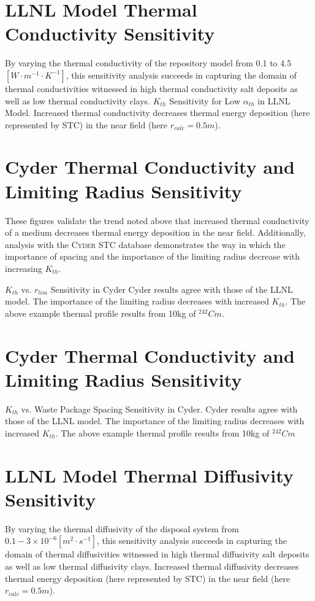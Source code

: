 \documentclass[letterpaper]{article}
\newcommand{\Cyder}{\textsc{Cyder}\xspace}
\begin{document}
\section*{LLNL Model Thermal Conductivity Sensitivity}
By varying the thermal conductivity of the repository model from 0.1 to 4.5 
$[W\cdot m^{-1} \cdot K^{-1}]$, this sensitivity analysis succeeds in capturing 
the domain of thermal conductivities witnessed in high thermal conductivity 
salt deposits as well as low thermal conductivity clays.
$K_{th}$ Sensitivity for Low $\alpha_{th}$ in LLNL Model.
Increased thermal conductivity decreases thermal energy deposition 
(here represented by STC) in the near field (here $r_{calc} = 0.5m$).

\section*{Cyder Thermal Conductivity and Limiting Radius Sensitivity}

These figures validate the trend noted above that 
increased thermal conductivity of a medium decreases thermal energy deposition 
in the near field. Additionally, analysis with the \Cyder STC database 
demonstrates the way in which the importance of spacing and the importance of 
the limiting radius decrease with increasing $K_{th}$.

$K_{th}$ vs. $r_{lim}$ Sensitivity in Cyder
Cyder results agree with 
those of the LLNL model. The importance of the limiting radius decreases with 
increased $K_{th}$. The above example thermal profile results from 10kg of 
$^{242}Cm$.

\section*{Cyder Thermal Conductivity and Limiting Radius Sensitivity}

$K_{th}$ vs. Waste Package Spacing Sensitivity in Cyder.
Cyder results 
agree with 
those of the LLNL model. The importance of the limiting radius decreases with 
increased $K_{th}$. The above example thermal profile results from 10kg of 
$^{242}Cm$




\section*{LLNL Model Thermal Diffusivity Sensitivity}
  By varying the thermal diffusivity of the disposal system from $0.1-3\times 
  10^{-6} [m^2\cdot s^{-1}]$, this sensitivity analysis succeeds in capturing 
  the domain of 
  thermal diffusivities witnessed in high thermal diffusivity salt deposits as 
  well as low thermal diffusivity clays.
    Increased thermal diffusivity decreases thermal energy deposition (here represented by STC) in the near field (here $r_{calc} = 0.5m$).
\end{document}
